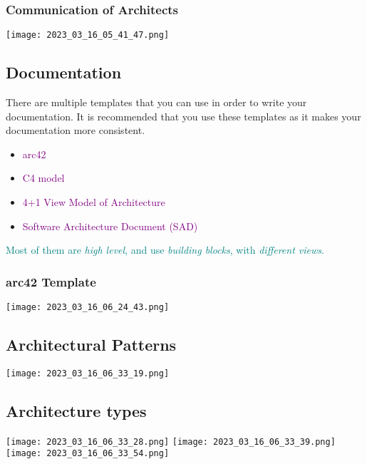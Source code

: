 \documentclass[main.tex,fontsize=8pt,paper=a4,paper=portrait,DIV=calc,]{scrartcl}
\begin{document}
\subsubsection{Communication of Architects}
\texttt{[image: 2023\_03\_16\_05\_41\_47.png]}

\subsection{Documentation}
There are multiple templates that you can use in order to write your documentation. \newline
It is recommended that you use these templates as it makes your documentation more consistent.\newline
\begin{itemize}
\item \textcolor{purple}{arc42}
\item \textcolor{purple}{C4 model}
\item \textcolor{purple}{4+1 View Model of Architecture}
\item \textcolor{purple}{Software Architecture Document (SAD)}
\end{itemize} 
\textcolor{teal}{Most of them are \emph{high level}, and use \emph{building blocks}, with \emph{different views}.}

\subsubsection{arc42 Template}
\texttt{[image: 2023\_03\_16\_06\_24\_43.png]}

\subsection{Architectural Patterns}
\texttt{[image: 2023\_03\_16\_06\_33\_19.png]}

\subsection{Architecture types}
\texttt{[image: 2023\_03\_16\_06\_33\_28.png]}
\texttt{[image: 2023\_03\_16\_06\_33\_39.png]}\newline
\texttt{[image: 2023\_03\_16\_06\_33\_54.png]}
\end{document}
